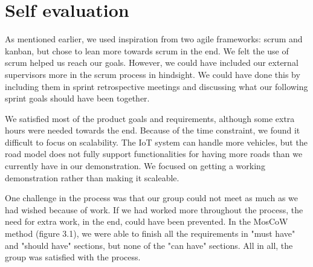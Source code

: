 \section{Self evaluation}

As mentioned earlier, we used inspiration from two agile frameworks: scrum and kanban, but chose to lean more towards scrum in the end. We felt the use of scrum helped us reach our goals. However, we could have included our external supervisors more in the scrum process in hindsight. We could have done this by including them in sprint retrospective meetings and discussing what our following sprint goals should have been together.

We satisfied most of the product goals and requirements, although some extra hours were needed towards the end. Because of the time constraint, we found it difficult to focus on scalability. The IoT system can handle more vehicles, but the road model does not fully support functionalities for having more roads than we currently have in our demonstration. We focused on getting a working demonstration rather than making it scaleable.  

One challenge in the process was that our group could not meet as much as we had wished because of work. If we had worked more throughout the process, the need for extra work, in the end, could have been prevented. In the MosCoW method (figure 3.1), we were able to finish all the requirements in "must have" and "should have" sections, but none of the "can have" sections. All in all, the group was satisfied with the process.

